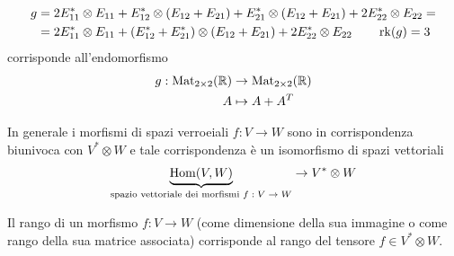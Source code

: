 \documentclass[../main.tex]{subfiles}
\begin{document}
\begin{example}
\begin{align*}
        g & = 2E_{11}^* \otimes E_{11} + E_{12}^* \otimes (E_{12} + E_{21}) + E_{21}^* \otimes (E_{12} + E_{21}) + 2E_{22}^* \otimes E_{22} = \\
          & = 2E_{11}^* \otimes E_{11} + (E_{12}^* + E_{21}^*) \otimes (E_{12} + E_{21}) + 2E_{22}^* \otimes E_{22} \qquad \operatorname{rk}(g) = 3
    \end{align*}
    corrisponde all'endomorfismo
    \begin{align*}
        g: \operatorname{Mat}_{2 \times 2}(\mathbb{R}) & \rightarrow \operatorname{Mat}_{2 \times 2}(\mathbb{R}) \\
        A                                & \mapsto A + A^T
    \end{align*}
\end{example}

In generale i morfismi di spazi verroeiali $f: V \rightarrow W$ sono in corrispondenza biunivoca con $V^* \otimes W$ e tale corrispondenza è un isomorfismo di spazi vettoriali
\begin{equation*}
    \underbrace{\operatorname{Hom}(V, W)}_{\text{spazio vettoriale dei morfismi $f: V \rightarrow W$}} \rightarrow V^* \otimes W
\end{equation*}

Il rango di un morfismo $f: V \rightarrow W$ (come dimensione della sua immagine o come rango della sua matrice associata) corrisponde al rango del tensore $f \in V^* \otimes W$.
\end{document}

